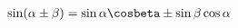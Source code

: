 \documentclass[preview]{standalone}
\begin{document}
\begin{align*}
\sin(\alpha \pm \beta) = \sin\alpha\cosbeta \pm \sin\beta\cos\alpha
\end{align*}
\end{document}
